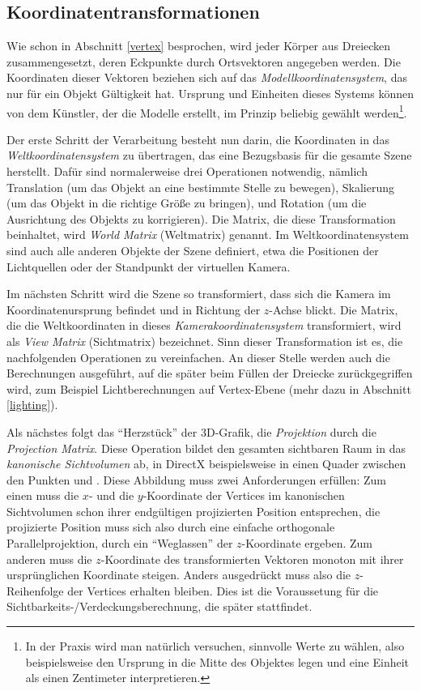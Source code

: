 \subsection{Koordinatentransformationen}
\label{coordinatesystems}
Wie schon in Abschnitt \ref{vertex} besprochen, wird jeder Körper aus Dreiecken zusammengesetzt, deren Eckpunkte durch Ortsvektoren angegeben werden. Die Koordinaten dieser Vektoren beziehen sich auf das \emph{Modellkoordinatensystem}, das nur für ein Objekt Gültigkeit hat. Ursprung und Einheiten dieses Systems können von dem Künstler, der die Modelle erstellt, im Prinzip beliebig gewählt werden\footnote{In der Praxis wird man natürlich versuchen, sinnvolle Werte zu wählen, also beispielsweise den Ursprung in die Mitte des Objektes legen und eine Einheit als einen Zentimeter interpretieren.}.

Der erste Schritt der Verarbeitung besteht nun darin, die Koordinaten in das \emph{Weltkoordinatensystem} zu übertragen, das eine Bezugsbasis für die gesamte Szene herstellt. Dafür sind normalerweise drei Operationen notwendig, nämlich Translation (um das Objekt an eine bestimmte Stelle zu bewegen), Skalierung (um das Objekt in die richtige Größe zu bringen), und Rotation (um die Ausrichtung des Objekts zu korrigieren). Die Matrix, die diese Transformation beinhaltet, wird \emph{World Matrix} (Weltmatrix) genannt. Im Weltkoordinatensystem sind auch alle anderen Objekte der Szene definiert, etwa die Positionen der Lichtquellen oder der Standpunkt der virtuellen Kamera.

Im nächsten Schritt wird die Szene so transformiert, dass sich die Kamera im Koordinatenursprung befindet und in Richtung der $z$-Achse blickt. Die Matrix, die die Weltkoordinaten in dieses \emph{Kamerakoordinatensystem} transformiert, wird als \emph{View Matrix} (Sichtmatrix) bezeichnet. Sinn dieser Transformation ist es, die nachfolgenden Operationen zu vereinfachen. An dieser Stelle werden auch die Berechnungen ausgeführt, auf die später beim Füllen der Dreiecke zurückgegriffen wird, zum Beispiel Lichtberechnungen auf Vertex-Ebene (mehr dazu in Abschnitt \ref{lighting}).

Als nächstes folgt das \enquote{Herzstück} der 3D-Grafik, die \emph{Projektion} durch die \emph{Projection Matrix}. Diese Operation bildet den gesamten sichtbaren Raum in das \emph{kanonische Sichtvolumen} ab, in DirectX beispielsweise in einen Quader zwischen den Punkten  und . Diese Abbildung muss zwei Anforderungen erfüllen: Zum einen muss die $x$- und die $y$-Koordinate der Vertices im kanonischen Sichtvolumen schon ihrer endgültigen projizierten Position entsprechen, die projizierte Position muss sich also durch eine einfache orthogonale Parallelprojektion, durch ein \enquote{Weglassen} der $z$-Koordinate ergeben. Zum anderen muss die $z$-Koordinate des transformierten Vektoren monoton mit ihrer ursprünglichen Koordinate steigen. Anders ausgedrückt muss also die $z$-Reihenfolge der Vertices erhalten bleiben. Dies ist die Voraussetung für die Sichtbarkeits-/Verdeckungsberechnung, die später stattfindet.

